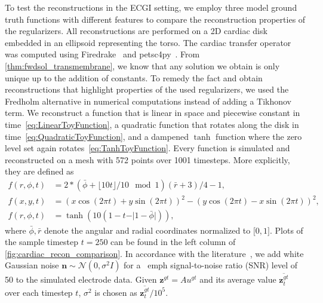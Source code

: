\documentclass{article}
\begin{document}
	To test the reconstructions in the ECGI setting, we employ three model ground truth functions with different features to compare the reconstruction properties of the regularizers.
	All reconstructions are performed on a 2D cardiac disk embedded in an ellipsoid representing the torso.
	The cardiac transfer operator was computed using Firedrake~\cite{FiredrakeUserManual} and petsc4py~\cite{Da11}.
	From \cref{thm:fwdsol_transmembrane}, we know that any solution we obtain is only unique up to the addition of constants.
	To remedy the fact and obtain reconstructions that highlight properties of the used regularizers, we used the Fredholm alternative in numerical computations instead of adding a Tikhonov term.
	We reconstruct a function that is linear in space and piecewise constant in time~\cref{eq:LinearToyFunction}, a quadratic function that rotates along the disk in time~\cref{eq:QuadraticToyFunction}, and a dampened $\tanh$ function where the zero level set again rotates~\cref{eq:TanhToyFunction}.
	Every function is simulated and reconstructed on a mesh with 572 points over 1001 timesteps.
	More explicitly, they are defined as
	\begin{align}
		f(r, \phi, t) &= 2*(\bar{\phi} + \lfloor 10t\rfloor/10 \mod 1)(\bar{r}+3)/4\label{eq:LinearToyFunction} - 1,\\
		f(x, y, t) &= (x\cos(2\pi t) + y \sin(2\pi t)\label{eq:QuadraticToyFunction})^2 - (y\cos(2\pi t) - x \sin(2\pi t))^2,\\
		f(r, \phi, t) &= \tanh(10(1-t-\vert 1 - \bar{\phi}\vert))\label{eq:TanhToyFunction},
	\end{align}
	where $\bar{\phi}, \bar{r}$ denote the angular and radial coordinates normalized to $\lbrack 0, 1\rbrack$.
	Plots of the sample timestep $t=250$ can be found in the left column of \cref{fig:cardiac_recon_comparison}.
	In accordance with the literature~\cite{El17}, we add white Gaussian noise $\mathbf{n} \sim \mathcal{N}(0, \sigma^2I)$ for a \ emph {signal-to-noise ratio (SNR)} level of 50 to the simulated electrode data.
	Given $\mathbf{z}^{gt}=Au^{gt}$ and its average value $\overline{\mathbf{z}_t^{gt}}$ over each timestep $t$, $\sigma^2$ is chosen as $\overline{\mathbf{z}_t^{gt}}/ 10^5$.
	
\end{document}
